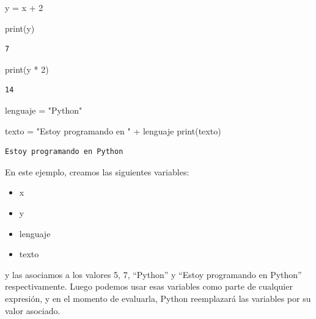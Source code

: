 \documentclass[
  letterpaper,
  DIV=11,
  numbers=noendperiod]{scrreprt}
\newenvironment{Shaded}{\begin{snugshade}}{\end{snugshade}}
\newcommand{\BuiltInTok}[1]{\textcolor[rgb]{0.00,0.23,0.31}{#1}}
\newcommand{\DecValTok}[1]{\textcolor[rgb]{0.68,0.00,0.00}{#1}}
\newcommand{\NormalTok}[1]{\textcolor[rgb]{0.00,0.23,0.31}{#1}}
\newcommand{\OperatorTok}[1]{\textcolor[rgb]{0.37,0.37,0.37}{#1}}
\newcommand{\StringTok}[1]{\textcolor[rgb]{0.13,0.47,0.30}{#1}}
\providecommand{\tightlist}{%
  \setlength{\itemsep}{0pt}\setlength{\parskip}{0pt}}\usepackage{longtable,booktabs,array}
\begin{document}
\begin{Shaded}
\begin{Highlighting}[]
\NormalTok{y }\OperatorTok{=}\NormalTok{ x }\OperatorTok{+} \DecValTok{2}
\end{Highlighting}
\end{Shaded}

\begin{Shaded}
\begin{Highlighting}[]
\BuiltInTok{print}\NormalTok{(y)}
\end{Highlighting}
\end{Shaded}

\begin{verbatim}
7
\end{verbatim}

\begin{Shaded}
\begin{Highlighting}[]
\BuiltInTok{print}\NormalTok{(y }\OperatorTok{*} \DecValTok{2}\NormalTok{)}
\end{Highlighting}
\end{Shaded}

\begin{verbatim}
14
\end{verbatim}

\begin{Shaded}
\begin{Highlighting}[]
\NormalTok{lenguaje }\OperatorTok{=} \StringTok{"Python"}

\NormalTok{texto }\OperatorTok{=} \StringTok{"Estoy programando en "} \OperatorTok{+}\NormalTok{ lenguaje}
\BuiltInTok{print}\NormalTok{(texto)}
\end{Highlighting}
\end{Shaded}

\begin{verbatim}
Estoy programando en Python
\end{verbatim}

En este ejemplo, creamos las siguientes variables:

\begin{itemize}
\tightlist
\item
  x
\item
  y
\item
  lenguaje
\item
  texto
\end{itemize}

y las asociamos a los valores 5, 7, ``Python'' y ``Estoy programando en
Python'' respectivamente. Luego podemos usar esas variables como parte
de cualquier expresión, y en el momento de evaluarla, Python reemplazará
las variables por su valor asociado.
\end{document}
